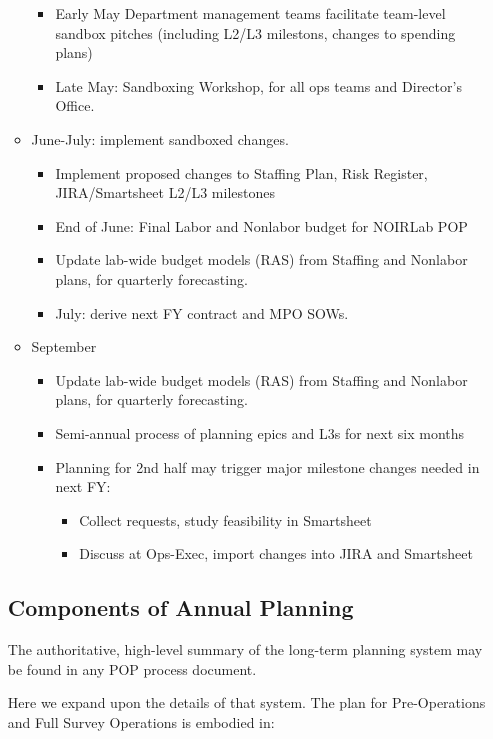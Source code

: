 \begin{itemize}
\begin{itemize}
\begin{itemize}
            \item Early May Department management teams facilitate team-level sandbox pitches (including L2/L3 milestons, changes to spending plans)
            \item Late May: Sandboxing Workshop, for all ops teams and Director's Office.
       \end{itemize}
\item June-July: implement sandboxed changes.
   \begin{itemize}
      \item Implement proposed changes to Staffing Plan, Risk Register, JIRA/Smartsheet L2/L3 milestones
      \item End of June: Final Labor and Nonlabor budget for NOIRLab POP
      \item Update lab-wide budget models (RAS) from Staffing and Nonlabor plans, for quarterly forecasting.
      \item July: derive next FY contract and MPO SOWs.
   \end{itemize}
\item September
   \begin{itemize}
      \item Update lab-wide budget models (RAS) from Staffing and Nonlabor plans, for quarterly forecasting.
      \item Semi-annual process of planning epics and L3s for next six months
      \item Planning for 2nd half may trigger major milestone changes needed in next FY:
      \begin{itemize}
         \item Collect requests, study feasibility in Smartsheet
         \item Discuss at Ops-Exec, import changes into \gls{JIRA} and Smartsheet
      \end{itemize}
   \end{itemize}
\end{itemize}

\subsection{Components of Annual Planning}
\label{sec:annual-planning}
The authoritative, high-level summary of the long-term planning system may be found in any POP process document.

Here we expand upon the details of that system.
The plan for Pre-Operations and Full Survey Operations is embodied in:


\end{itemize}
